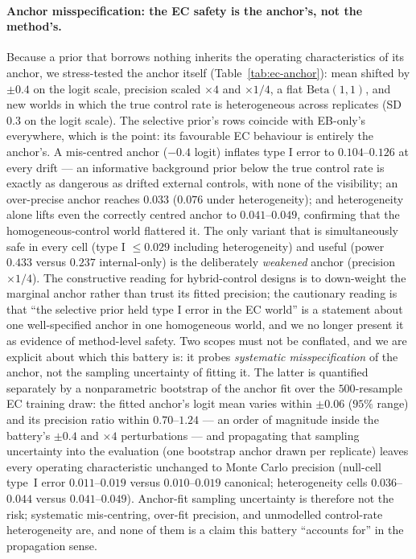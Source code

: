\documentclass[11pt]{article}
\begin{document}
\paragraph{Anchor misspecification: the EC safety is the anchor's, not the
method's.} Because a prior that borrows nothing inherits the operating
characteristics of its anchor, we stress-tested the anchor itself
(Table~\ref{tab:ec-anchor}): mean shifted by $\pm 0.4$ on the logit scale,
precision scaled $\times 4$ and $\times 1/4$, a flat $\mathrm{Beta}(1,1)$,
and new worlds in which the true control rate is heterogeneous across
replicates (SD $0.3$ on the logit scale). The selective prior's rows coincide
with EB-only's everywhere, which is the point: its favourable EC behaviour is
entirely the anchor's. A mis-centred anchor ($-0.4$ logit) inflates type I
error to $0.104$--$0.126$ at every drift --- an informative background prior
below the true control rate is exactly as dangerous as drifted external
controls, with none of the visibility; an over-precise anchor reaches
$0.033$ ($0.076$ under heterogeneity); and heterogeneity alone lifts even the
correctly centred anchor to $0.041$--$0.049$, confirming that the
homogeneous-control world flattered it. The only variant that is
simultaneously safe in every cell (type I $\le 0.029$ including
heterogeneity) and useful (power $0.433$ versus $0.237$ internal-only) is
the deliberately \emph{weakened} anchor (precision $\times 1/4$). The
constructive reading for hybrid-control designs is to down-weight the
marginal anchor rather than trust its fitted precision; the cautionary
reading is that ``the selective prior held type I error in the EC world''
is a statement about one well-specified anchor in one homogeneous world,
and we no longer present it as evidence of method-level safety. Two scopes
must not be conflated, and we are explicit about which this battery is: it
probes \emph{systematic misspecification} of the anchor, not the sampling
uncertainty of fitting it. The latter is quantified separately by a
nonparametric bootstrap of the anchor fit over the $500$-resample EC
training draw: the fitted anchor's logit mean varies within $\pm 0.06$
($95\%$ range) and its precision ratio within $0.70$--$1.24$ --- an order
of magnitude inside the battery's $\pm 0.4$ and $\times 4$ perturbations
--- and propagating that sampling uncertainty into the evaluation (one
bootstrap anchor drawn per replicate) leaves every operating
characteristic unchanged to Monte Carlo precision (null-cell type~I error
$0.011$--$0.019$ versus $0.010$--$0.019$ canonical; heterogeneity cells
$0.036$--$0.044$ versus $0.041$--$0.049$). Anchor-fit sampling
uncertainty is therefore not the risk; systematic mis-centring, over-fit
precision, and unmodelled control-rate heterogeneity are, and none of
them is a claim this battery ``accounts for'' in the propagation sense.
\end{document}
